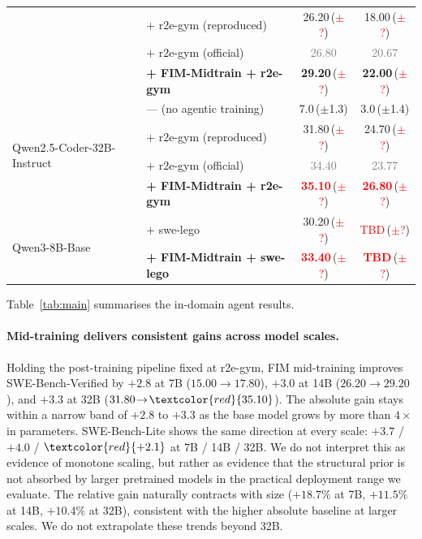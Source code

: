 \begin{table}[t]
\begin{tabular}{llcc}
  & + r2e-gym (reproduced)               & 26.20\,(\textcolor{red}{$\pm$?})              & 18.00\,(\textcolor{red}{$\pm$?}) \\
  & + r2e-gym (official)                 & \textcolor{gray}{26.80}                        & \textcolor{gray}{20.67} \\
  & \textbf{+ FIM-Midtrain + r2e-gym}    & \textbf{29.20}\,(\textcolor{red}{$\pm$?})     & \textbf{22.00}\,(\textcolor{red}{$\pm$?}) \\
\midrule
\multirow{4}{*}{Qwen2.5-Coder-32B-Instruct}
  & --- (no agentic training)            & 7.0\,($\pm$1.3)                              & 3.0\,($\pm$1.4) \\
  & + r2e-gym (reproduced)               & 31.80\,(\textcolor{red}{$\pm$?})              & 24.70\,(\textcolor{red}{$\pm$?}) \\
  & + r2e-gym (official)                 & \textcolor{gray}{34.40}                        & \textcolor{gray}{23.77} \\
  & \textbf{+ FIM-Midtrain + r2e-gym}    & \textbf{\textcolor{red}{35.10}}\,(\textcolor{red}{$\pm$?}) & \textbf{\textcolor{red}{26.80}}\,(\textcolor{red}{$\pm$?}) \\
\midrule
\multirow{2}{*}{Qwen3-8B-Base}
  & + swe-lego                           & 30.20\,(\textcolor{red}{$\pm$?})              & \textcolor{red}{TBD}\,(\textcolor{red}{$\pm$?}) \\
  & \textbf{+ FIM-Midtrain + swe-lego}   & \textbf{\textcolor{red}{33.40}}\,(\textcolor{red}{$\pm$?}) & \textbf{\textcolor{red}{TBD}}\,(\textcolor{red}{$\pm$?}) \\
\bottomrule
\end{tabular}
\end{table}

Table~\ref{tab:main} summarises the in-domain agent results.

\paragraph{Mid-training delivers consistent gains across model scales.}
Holding the post-training pipeline fixed at r2e-gym, FIM mid-training
improves SWE-Bench-Verified by $+2.8$ at 7B ($15.00\!\to\!17.80$),
$+3.0$ at 14B ($26.20\!\to\!29.20$), and $+3.3$ at 32B
($31.80\!\to\!\textcolor{red}{35.10}$). The absolute gain stays within a
narrow band of $+2.8$ to $+3.3$ as the base model grows by more than
$4{\times}$ in parameters. SWE-Bench-Lite shows the same direction at every
scale: $+3.7$ / $+4.0$ / $\textcolor{red}{+2.1}$ at 7B / 14B / 32B. We do
not interpret this as evidence of monotone scaling, but rather as evidence
that the structural prior is not absorbed by larger pretrained models in
the practical deployment range we evaluate. The relative gain naturally
contracts with size ($+18.7\%$ at 7B, $+11.5\%$ at 14B, $+10.4\%$ at 32B),
consistent with the higher absolute baseline at larger scales. We do not
extrapolate these trends beyond 32B.

